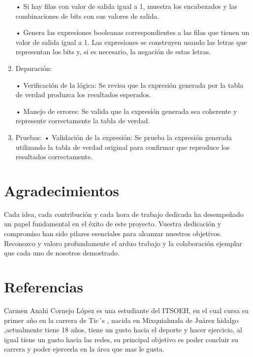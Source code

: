 \documentclass{IEEEcsmag}
\begin{document}
\begin{enumerate}
•	Si hay filas con valor de salida igual a 1, muestra los encabezados y las combinaciones de bits con sus valores de salida.

•	Genera las expresiones booleanas correspondientes a las filas que tienen un valor de salida igual a 1. Las expresiones se construyen usando las letras que representan los bits y, si es necesario, la negación de estas letras.\newline\newline

\item Depuración:

•	Verificación de la lógica: Se revisa que la expresión generada por la tabla de verdad produzca los resultados esperados.

•	Manejo de errores: Se valida que la expresión generada sea coherente y represente correctamente la tabla de verdad.\newline\newline

 \item Pruebas:
•	Validación de la expresión: Se prueba la expresión generada utilizando la tabla de verdad original para confirmar que reproduce los resultados correctamente.

\end{enumerate}

\section{Agradecimientos}

Cada idea, cada contribución y cada hora de trabajo dedicada ha desempeñado un papel fundamental en el éxito de este proyecto. Vuestra dedicación y compromiso han sido pilares esenciales para alcanzar nuestros objetivos. Reconozco y valoro profundamente el arduo trabajo y la colaboración ejemplar que cada uno de nosotros demostrado.

\section{Referencias}

Carmen Anahi Cornejo López es una estudiante del ITSOEH, en el cual cursa su primer año en la carrera de Tic´s , nacida en Mixquiahuala de Juárez hidalgo ,actualmente tiene 18 años, tiene un gusto hacia el deporte y hacer ejercicio, al igual tiene un gusto hacia las redes, su principal objetivo es poder concluir su carrera y poder ejercerla en la área que mas le gusta.\newline\newline
\end{document}
